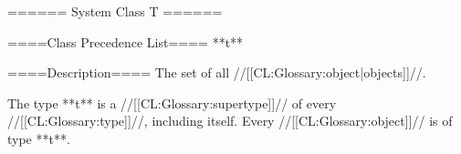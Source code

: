 ====== System Class T ======

====Class Precedence List==== 
**t**

====Description==== 
The set of all //[[CL:Glossary:object|objects]]//.

The type **t** is a //[[CL:Glossary:supertype]]// of every //[[CL:Glossary:type]]//, including itself. Every //[[CL:Glossary:object]]// is of type **t**.

